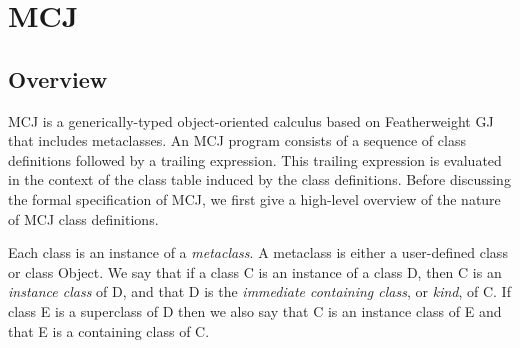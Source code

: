 \documentclass{acmconfbig}
\begin{document}


\section{MCJ}
\label{MCJ}

\subsection{Overview}

\label{MCJintro}

MCJ is a generically-typed object-oriented calculus based on
Featherweight GJ that includes metaclasses. An MCJ program consists of
a sequence of class definitions followed by a trailing
expression. This trailing expression is evaluated in the context of
the class table induced by the class definitions.  Before discussing
the formal specification of MCJ, we first give a high-level overview
of the nature of MCJ class definitions.

Each class is an instance of a \emph{metaclass}.  A metaclass is
either a user-defined class or class {\txt Object}.  We say that if a
class {\txt C} is an instance of a class {\txt D}, then {\txt C} is an
\emph{instance class} of {\txt D}, and that {\txt D} is the
\emph{immediate containing class}, or \emph{kind}, of {\txt C}.  If
class {\txt E} is a superclass of {\txt D} then we also say that {\txt
C} is an instance class of {\txt E} and that {\txt E} is a containing
class of {\txt C}.
\end{document}
